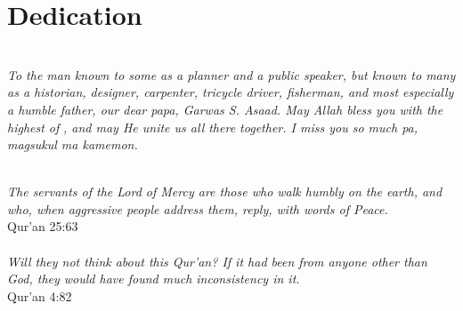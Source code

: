 \chapter*{Dedication}
\begin{center}
    \\

    \textit{To the man known to some as a planner and a public speaker, but known to many as a historian, designer, carpenter, tricycle driver, fisherman, and most especially a humble father, our dear papa, Garwas S. Asaad. May Allah  bless you with the highest of}  \textit{, and may He unite us all there together. I miss you so much pa, magsukul ma kamemon.}\\
    \begin{minipage}{.6\linewidth}
        \centering
        \vspace{4cm}
        \\
        \textit{The servants of the Lord of Mercy are those who walk humbly on the earth, and who, when aggressive people address them, reply, with words of Peace.}\\
        {\sc Qur'an 25:63}\\[2cm]
        \\
        \textit{Will they not think about this Qur'an? If it had been from anyone other than God, they would have found much inconsistency in it.}\\
        {\sc Qur'an 4:82}\\[1cm]
    \end{minipage}
\end{center}